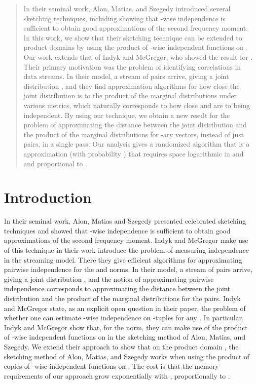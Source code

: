 \def\draft{0}  \documentclass[proceedings]{stacs}
\theoremstyle{plain}\newtheorem{satz}[thm]{Satz}
\theoremstyle{definition}\newtheorem{crucial}[thm]{Crucial Definition}
\begin{document}
\begin{abstract}
In their seminal work, Alon, Matias, and Szegedy introduced
several sketching techniques, including showing that -wise
independence is sufficient to obtain good approximations of the second
frequency moment.  In this work, we show that their sketching
technique can be extended to product domains  by using the
product of -wise independent functions on .
Our work extends that of Indyk and McGregor, who showed the result
for .  Their primary motivation was the problem of identifying correlations in data streams.
In their model, a stream of pairs  arrive,
giving a joint distribution , and they find approximation
algorithms for how close the joint distribution is to the product of
the marginal distributions under various metrics, which naturally
corresponds to how close  and  are to being independent.
By using our technique, we obtain a new result for the problem of
approximating the  distance between the
joint distribution and the product of the marginal distributions for -ary
vectors, instead of just pairs, in a single pass.
Our analysis gives a randomized algorithm that is a  approximation (with probability ) that
requires space logarithmic in  and  and proportional to .
\vspace{-0.6cm}
\end{abstract}

\maketitle

\section{Introduction}


In their seminal work, Alon, Matias and Szegedy \cite{ams} presented
celebrated sketching techniques and showed that -wise independence
is sufficient to obtain good approximations of the second frequency
moment.  Indyk and McGregor \cite{IM08} make use of this technique in
their work introduce the problem of measuring independence in the
streaming model.  There they give efficient algorithms for
approximating pairwise independence for the  and  norms.
In their model, a stream of pairs  arrive, giving a
joint distribution , and the notion of approximating pairwise
independence corresponds to approximating the distance between the
joint distribution and the product of the marginal distributions for
the pairs.  Indyk and McGregor state, as an explicit open question in
their paper, the problem of whether one can estimate -wise
independence on -tuples for any .  In particular, Indyk and McGregor show that, for the  norm, they
can make use of the product of -wise independent functions on 
in the sketching method of Alon, Matias, and Szegedy.  We extend their
approach to show that on the product domain , the sketching
method of Alon, Matias, and Szegedy works when using the product of
 copies of -wise independent functions on .  The cost is that the
memory requirements of our approach grow exponentially with ,
proportionally to .
\end{document}
